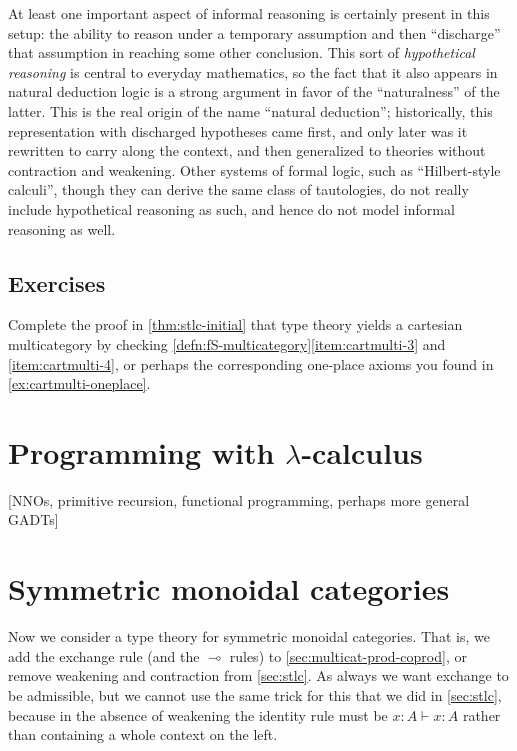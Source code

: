 \documentclass{book}
\let\types\vdash
\let\hom\multimap
\begin{document}
At least one important aspect of informal reasoning is certainly present in this setup: the ability to reason under a temporary assumption and then ``discharge'' that assumption in reaching some other conclusion.
This sort of \emph{hypothetical reasoning} is central to everyday mathematics, so the fact that it also appears in natural deduction logic is a strong argument in favor of the ``naturalness'' of the latter.
This is the real origin of the name ``natural deduction''; historically, this representation with discharged hypotheses came first, and only later was it rewritten to carry along the context, and then generalized to theories without contraction and weakening.
Other systems of formal logic, such as ``Hilbert-style calculi'', though they can derive the same class of tautologies, do not really include hypothetical reasoning as such, and hence do not model informal reasoning as well.

\subsection*{Exercises}

\begin{ex}\label{ex:stlc-cartmulti}
  Complete the proof in \cref{thm:stlc-initial} that type theory yields a cartesian multicategory by checking \cref{defn:fS-multicategory}\ref{item:cartmulti-3} and \ref{item:cartmulti-4}, or perhaps the corresponding one-place axioms you found in \cref{ex:cartmulti-oneplace}.
\end{ex}


\section{Programming with $\lambda$-calculus}
\label{sec:primrec}

[NNOs, primitive recursion, functional programming, perhaps more general GADTs]


\section{Symmetric monoidal categories}
\label{sec:symmoncat}

Now we consider a type theory for symmetric monoidal categories.
That is, we add the exchange rule (and the $\hom$ rules) to \cref{sec:multicat-prod-coprod}, or remove weakening and contraction from \cref{sec:stlc}.
As always we want exchange to be admissible, but we cannot use the same trick for this that we did in \cref{sec:stlc}, because in the absence of weakening the identity rule must be $x:A\types x:A$ rather than containing a whole context on the left.
\end{document}
